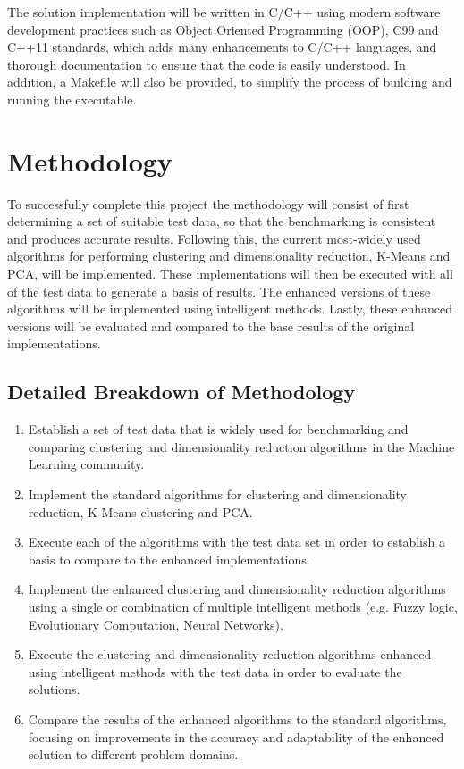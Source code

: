 \documentclass{article}
\begin{document}
The solution implementation will be written in C/C++ using modern software development practices such as Object Oriented Programming (OOP), C99\cite{c99} and C++11\cite{cpp11} standards, which adds many enhancements to C/C++ languages, and thorough documentation to ensure that the code is easily understood. In addition, a Makefile will also be provided, to simplify the process of building and running the executable.




\section{Methodology}

To successfully complete this project the methodology will consist of first determining a set of suitable test data, so that the benchmarking is consistent and produces accurate results. Following this, the current most-widely used algorithms for performing clustering and dimensionality reduction, K-Means and PCA, will be implemented. These implementations will then be executed with all of the test data to generate a basis of results. The enhanced versions of these algorithms will be implemented using intelligent methods. Lastly, these enhanced versions will be evaluated and compared to the base results of the original implementations.\\


\subsection{Detailed Breakdown of Methodology}

\begin{enumerate}

\item Establish a set of test data that is widely used for benchmarking and comparing clustering and dimensionality reduction algorithms in the Machine Learning community.

\item Implement the standard algorithms for clustering and dimensionality reduction, K-Means clustering and PCA.

\item Execute each of the algorithms with the test data set in order to establish a basis to compare to the enhanced implementations.

\item Implement the enhanced clustering and dimensionality reduction algorithms using a single or combination of multiple intelligent methods (e.g. Fuzzy logic, Evolutionary Computation, Neural Networks).

\item Execute the clustering and dimensionality reduction algorithms enhanced using intelligent methods with the test data in order to evaluate the solutions.

\item Compare the results of the enhanced algorithms to the standard algorithms, focusing on improvements in the accuracy and adaptability of the enhanced solution to different problem domains.

\end{enumerate}




\end{document}
